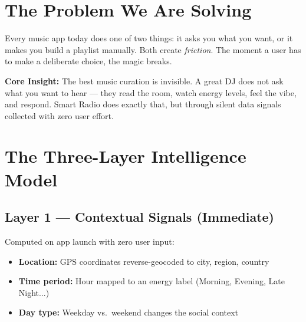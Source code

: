 \documentclass[12pt, a4paper]{report}
\newcommand{\term}[1]{\textit{\color{solarcolor}#1}}
\begin{document}
\section{The Problem We Are Solving}

Every music app today does one of two things: it asks you what you want,
or it makes you build a playlist manually. Both create \term{friction}.
The moment a user has to make a deliberate choice, the magic breaks.

\begin{tcolorbox}[theorybox]
\textbf{\color{violetcolor}Core Insight:} The best music curation is invisible.
A great DJ does not ask what you want to hear --- they read the room, watch
energy levels, feel the vibe, and respond. Smart Radio does exactly that,
but through silent data signals collected with zero user effort.
\end{tcolorbox}

\section{The Three-Layer Intelligence Model}

\begin{center}
\end{center}

\subsection{Layer 1 --- Contextual Signals (Immediate)}
Computed on app launch with zero user input:
\begin{itemize}[noitemsep]
  \item \textbf{Location:} GPS coordinates reverse-geocoded to city, region, country
  \item \textbf{Time period:} Hour mapped to an energy label (Morning, Evening, Late Night...)
  \item \textbf{Day type:} Weekday vs.\ weekend changes the social context
\end{itemize}
\end{document}
